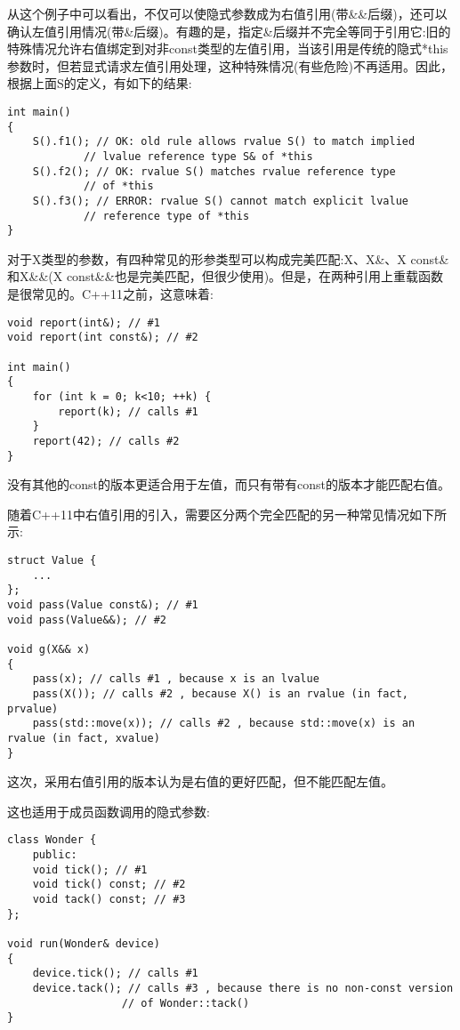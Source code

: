 从这个例子中可以看出，不仅可以使隐式参数成为右值引用(带\&\&后缀)，还可以确认左值引用情况(带\&后缀)。有趣的是，指定\&后缀并不完全等同于引用它:旧的特殊情况允许右值绑定到对非const类型的左值引用，当该引用是传统的隐式*this参数时，但若显式请求左值引用处理，这种特殊情况(有些危险)不再适用。因此，根据上面S的定义，有如下的结果:

\begin{lstlisting}[style=styleCXX]
int main()
{
	S().f1(); // OK: old rule allows rvalue S() to match implied
			// lvalue reference type S& of *this
	S().f2(); // OK: rvalue S() matches rvalue reference type
			// of *this
	S().f3(); // ERROR: rvalue S() cannot match explicit lvalue
			// reference type of *this
}
\end{lstlisting}



对于X类型的参数，有四种常见的形参类型可以构成完美匹配:X、X\&、X const\&和X\&\&(X const\&\&也是完美匹配，但很少使用)。但是，在两种引用上重载函数是很常见的。C++11之前，这意味着:

\begin{lstlisting}[style=styleCXX]
void report(int&); // #1
void report(int const&); // #2

int main()
{
	for (int k = 0; k<10; ++k) {
		report(k); // calls #1
	}
	report(42); // calls #2
}
\end{lstlisting}

没有其他的const的版本更适合用于左值，而只有带有const的版本才能匹配右值。

随着C++11中右值引用的引入，需要区分两个完全匹配的另一种常见情况如下所示:

\begin{lstlisting}[style=styleCXX]
struct Value {
	...
};
void pass(Value const&); // #1
void pass(Value&&); // #2

void g(X&& x)
{
	pass(x); // calls #1 , because x is an lvalue
	pass(X()); // calls #2 , because X() is an rvalue (in fact, prvalue)
	pass(std::move(x)); // calls #2 , because std::move(x) is an rvalue (in fact, xvalue)
}
\end{lstlisting}

这次，采用右值引用的版本认为是右值的更好匹配，但不能匹配左值。

这也适用于成员函数调用的隐式参数:

\begin{lstlisting}[style=styleCXX]
class Wonder {
	public:
	void tick(); // #1
	void tick() const; // #2
	void tack() const; // #3
};

void run(Wonder& device)
{
	device.tick(); // calls #1
	device.tack(); // calls #3 , because there is no non-const version
				  // of Wonder::tack()
}
\end{lstlisting}

